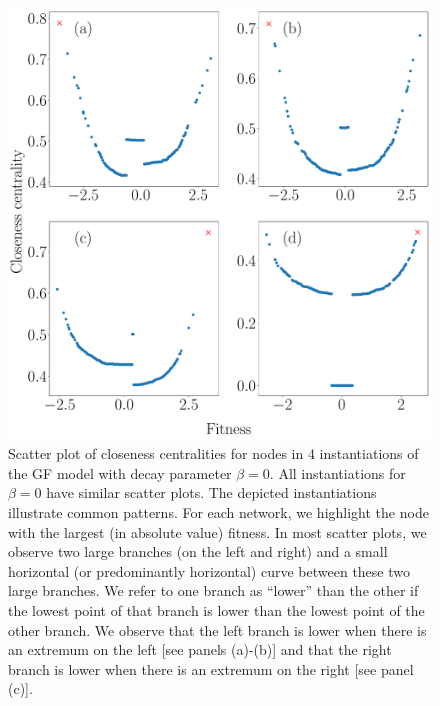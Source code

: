 \documentclass[%
 reprint,
 amsmath,amssymb,
 aps,
]{revtex4-1}
\begin{document}
\begin{figure}
    \centering
    \includegraphics[width=0.8\linewidth]{geographic_beta_0_examples2_largerfont.pdf}
    \caption{Scatter plot of closeness centralities for nodes in $4$ instantiations of the GF model with decay parameter $\beta = 0$. All instantiations for $\beta = 0$ have similar scatter plots. The depicted instantiations illustrate common patterns. For each network, we highlight the node with the largest (in absolute value) fitness. In most scatter plots, we observe two large branches (on the left and right) and a small horizontal (or predominantly horizontal) curve between these two large branches. We refer to one branch as ``lower'' than the other if the lowest point of that branch is lower than the lowest point of the other branch. We observe that the left branch is lower when there is an extremum on the left [see panels (a)-(b)] and that the right branch is lower when there is an extremum on the right [see panel (c)]. 
    }
    \label{fig:closeness_example}
\end{figure}
\end{document}

